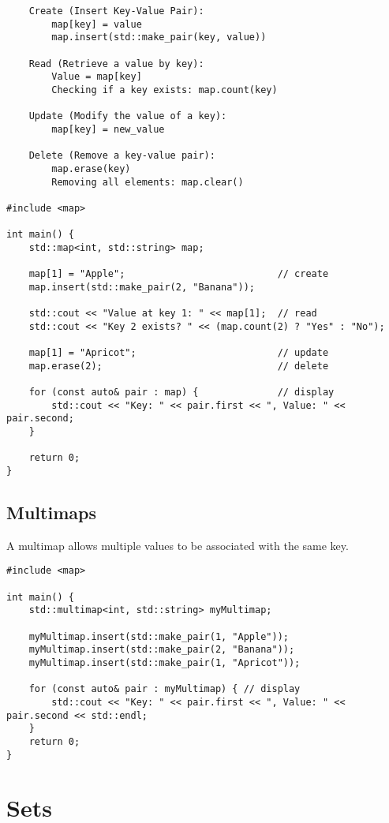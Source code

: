 \begin{verbatim}
    Create (Insert Key-Value Pair):
        map[key] = value 
        map.insert(std::make_pair(key, value))

    Read (Retrieve a value by key):
        Value = map[key]
        Checking if a key exists: map.count(key)

    Update (Modify the value of a key):
        map[key] = new_value

    Delete (Remove a key-value pair):
        map.erase(key)
        Removing all elements: map.clear()

#include <map>

int main() {
    std::map<int, std::string> map;

    map[1] = "Apple";                           // create
    map.insert(std::make_pair(2, "Banana"));

    std::cout << "Value at key 1: " << map[1];  // read
    std::cout << "Key 2 exists? " << (map.count(2) ? "Yes" : "No");

    map[1] = "Apricot";                         // update
    map.erase(2);                               // delete

    for (const auto& pair : map) {              // display
        std::cout << "Key: " << pair.first << ", Value: " << pair.second;
    }

    return 0;
}
\end{verbatim}

\subsection{Multimaps}

A multimap allows multiple values to be associated with the same key. 

\begin{verbatim}
#include <map>

int main() {
    std::multimap<int, std::string> myMultimap;

    myMultimap.insert(std::make_pair(1, "Apple"));
    myMultimap.insert(std::make_pair(2, "Banana"));
    myMultimap.insert(std::make_pair(1, "Apricot"));

    for (const auto& pair : myMultimap) { // display
        std::cout << "Key: " << pair.first << ", Value: " << pair.second << std::endl;
    }
    return 0;
}
\end{verbatim}

\section{Sets}

